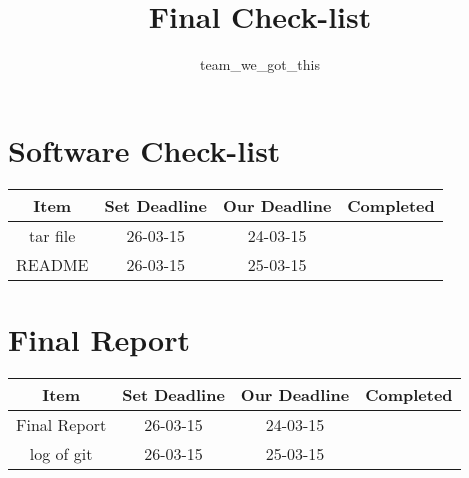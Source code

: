 \documentclass[]{article}
\title{Final Check-list}
\author{team\_we\_got\_this}
\begin{document}
\maketitle


\section*{Software Check-list}

\begin{tabular}{|c|c|c|c|}
	\hline Item & Set Deadline & Our Deadline & Completed \\ 
	\hline tar file & 26-03-15 & 24-03-15 &  \\ 
	\hline README & 26-03-15 & 25-03-15 &  \\ 
	\hline 
\end{tabular} 

\section{Final Report}

\begin{tabular}{|c|c|c|c|}
	\hline Item & Set Deadline & Our Deadline & Completed \\
	\hline Final Report & 26-03-15 & 24-03-15 &  \\ 
	\hline log of git & 26-03-15 & 25-03-15 &  \\ 
	\hline 
	\end{tabular} 
\end{document}

